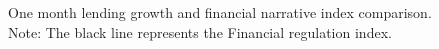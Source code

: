 \documentclass[
  letterpaper,
  DIV=11,
  numbers=noendperiod]{scrartcl}
\begin{document}
\begin{figure}[H]


\caption{\label{fig-comp_narrative_indexes_one_month}One month lending
growth and financial narrative index comparison. Note: The black line
represents the Financial regulation index.}

\end{figure}%

\newpage
\end{document}
